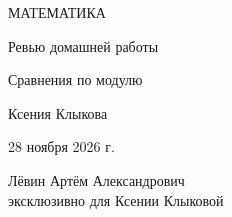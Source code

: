 \documentclass[a4paper,12pt]{article}
\begin{document}
\begin{titlepage}
\centering
\vspace*{25mm}
{\Large\color{accent} МАТЕМАТИКА\par}
\vspace{15mm}
{\huge Ревью домашней работы\par}
\vspace{9mm}
{\LARGE\color{accent} Сравнения по модулю\par}
\vfill
{\large Ксения Клыкова\par}
\vspace{9mm}
28 ноября 2026 г.\par
\vfill
{\small Лёвин Артём Александрович\\эксклюзивно для Ксении Клыковой\par}
\vspace{14mm}
\end{titlepage}
\setcounter{page}{1}
\end{document}
